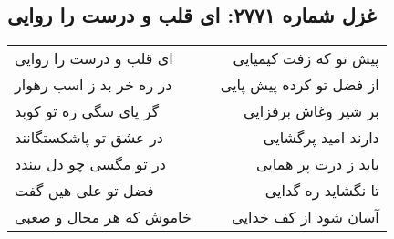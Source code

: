 \begin{center}
\section*{غزل شماره ۲۷۷۱: ای قلب و درست را روایی}
\label{sec:2771}
\begin{longtable}{l p{0.5cm} r}
ای قلب و درست را روایی
&&
پیش تو که زفت کیمیایی
\\
در ره خر بد ز اسب رهوار
&&
از فضل تو کرده پیش پایی
\\
گر پای سگی ره تو کوبد
&&
بر شیر وغاش برفزایی
\\
در عشق تو پاشکستگانند
&&
دارند امید پرگشایی
\\
در تو مگسی چو دل ببندد
&&
یابد ز درت پر همایی
\\
فضل تو علی هین گفت
&&
تا نگشاید ره گدایی
\\
خاموش که هر محال و صعبی
&&
آسان شود از کف خدایی
\\
\end{longtable}
\end{center}
